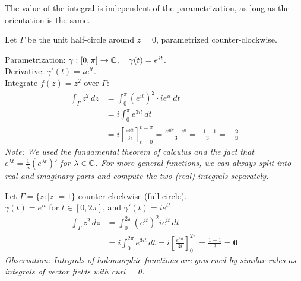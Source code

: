 \noindent The value of the integral is independent of the parametrization, as long as the orientation is the same.

\begin{example}[Example 1]
Let $\Gamma$ be the unit half-circle around $z=0$, parametrized counter-clockwise.

\begin{center}
\end{center}

Parametrization: $\gamma : [0, \pi] \rightarrow \mathbb{C}, \quad \gamma(t) = e^{it}$. \\
Derivative: $\gamma'(t) = i e^{it}$. \\
Integrate $f(z) = z^2$ over $\Gamma$:
\begin{align*}
\int_{\Gamma} z^2 \, dz &= \int_0^\pi (e^{it})^2 \cdot i e^{it} \, dt \\
&= i \int_0^\pi e^{3it} \, dt \\
&= i \left[ \frac{e^{3it}}{3i} \right]_{t=0}^{t=\pi} = \frac{e^{3i\pi} - e^0}{3} = \frac{-1 - 1}{3} = \mathbf{-\frac{2}{3}}
\end{align*}
\textit{Note: We used the fundamental theorem of calculus and the fact that $e^{\lambda t} = \frac{1}{\lambda} (e^{\lambda t})'$ for $\lambda \in \mathbb{C}$. For more general functions, we can always split into real and imaginary parts and compute the two (real) integrals separately.}
\end{example}

\begin{example}[Example 2]
Let $\Gamma = \{ z : |z| = 1 \}$ counter-clockwise (full circle). \\
$\gamma(t) = e^{it}$ for $t \in [0, 2\pi]$, and $\gamma'(t) = ie^{it}$.
\begin{align*}
\int_{\Gamma} z^2 \, dz &= \int_0^{2\pi} (e^{it})^2 i e^{it} \, dt \\
&= i \int_0^{2\pi} e^{3it} \, dt = i \left[ \frac{e^{3it}}{3i} \right]_0^{2\pi} = \frac{1 - 1}{3} = \mathbf{0}
\end{align*}
\textit{Observation: Integrals of holomorphic functions are governed by similar rules as integrals of vector fields with curl = 0.}
\end{example}


